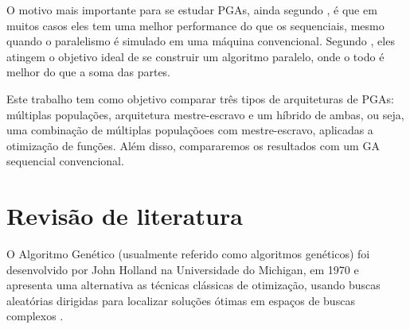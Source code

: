 \documentclass[12pt]{article}
\begin{document}
O motivo mais importante para se estudar PGAs, ainda segundo \cite{paraleltax}, é que em muitos casos eles tem uma melhor performance do que os sequenciais, mesmo quando o paralelismo é simulado em uma máquina convencional. Segundo \cite{albasurvey}, eles atingem o objetivo ideal de se construir um algoritmo paralelo, onde o todo é melhor do que a soma das partes.

Este trabalho tem como objetivo comparar três tipos de arquiteturas de PGAs: múltiplas populações, arquitetura mestre-escravo e um híbrido de ambas, ou seja, uma combinação de múltiplas populaçõoes com mestre-escravo, aplicadas a otimização de funções. Além disso, compararemos os resultados com um GA sequencial convencional.

\section{Revisão de literatura} %
\label{sec:revisao_bibliogragica}


O Algoritmo Genético (usualmente referido como algoritmos genéticos) foi desenvolvido por John Holland na Universidade do Michigan, em 1970 \cite{holland75} e apresenta uma alternativa as técnicas clássicas de otimização, usando buscas aleatórias dirigidas para localizar soluções ótimas em espaços de buscas complexos \cite{gasurvey}.





\end{document}
